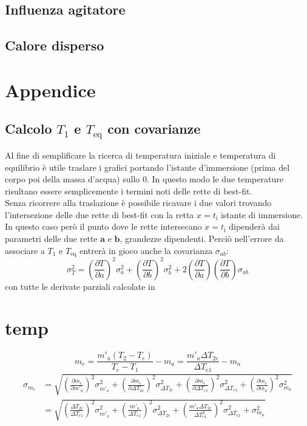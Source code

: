 \documentclass{article}
\begin{document}
	\subsection{Influenza agitatore}
	\subsection{Calore disperso}
	
	\newpage
	\section{Appendice}
	\subsection{Calcolo \(T_{1}\) e \(T_{\text{eq}}\) con covarianze}
	Al fine di semplificare la ricerca di temperatura iniziale e temperatura di equilibrio è utile traslare i grafici portando l'istante d'immersione (prima del corpo poi della massa d'acqua) sullo \(0\). In questo modo le due temperature risultano essere semplicemente i termini noti delle rette di best-fit. \\
	
	Senza ricorrere alla traslazione è possibile ricavare i due valori trovando l'intersezione delle due rette di best-fit con la retta \(x=t_{\text{i}}\) istante di immersione. In questo caso però il punto dove le rette intersecano \(x=t_{\text{i}}\) dipenderà dai parametri delle due rette  \(\boldsymbol{a}\) e \(\boldsymbol{b}\), grandezze dipendenti. Perciò nell'errore da associare a \(T_{1}\) e \(T_{\text{eq}}\) entrerà in gioco anche la covarianza \(\sigma_{ab}\):
	\[ 
	\sigma_T^2 = \left(\frac{\partial T}{\partial a}\right)^2 \sigma_a^2 + \left(\frac{\partial T}{\partial b}\right)^2 \sigma_b^2 + 2\left(\frac{\partial T}{\partial a}\right)\left(\frac{\partial T}{\partial b}\right) \sigma_{ab}
	\]
	con tutte le derivate parziali calcolate in 
	
	\newpage
	\section{temp}
	\[ 
	m_{e} = \frac{m'_{a}\left(T_{2} - T_{e}\right)}{T_{e} - T_{1}} - m_{a} =  \frac{m'_{a}\Delta T_{2e}}{\Delta T_{e1}} - m_{a}
	\]
	\begin{align*}
		\sigma_{m_e} &= \sqrt{\left(\frac{\partial m_{e}}{\partial m'_{a}}\right)^2\sigma_{m'_{a}}^2 + \left(\frac{\partial m_{e}}{\partial\Delta T_{2e}}\right)^2\sigma_{\Delta T_{2e}}^2 + \left(\frac{\partial m_{e}}{\partial\Delta T_{e1}}\right)^2\sigma_{\Delta T_{e1}}^2 + \left(\frac{\partial m_{e}}{\partial m_{a}}\right)^2\sigma^2_{m_{a}}} \\
					 &= \sqrt{\left(\frac{\Delta T_{2e}}{\Delta T_{e1}}\right)^2\sigma_{m'_{a}}^2 + \left(\frac{m'_{a}}{\Delta T_{e1}}\right)^2\sigma^2_{\Delta T_{2e}} + \left(\frac{m'_{a}\Delta T_{2e}}{\Delta T_{e1}^2}\right)^2\sigma^2_{\Delta T_{e1}}+\sigma^2_{m_{a}}}
	\end{align*}
	\vspace{5cm}
	
\end{document}
